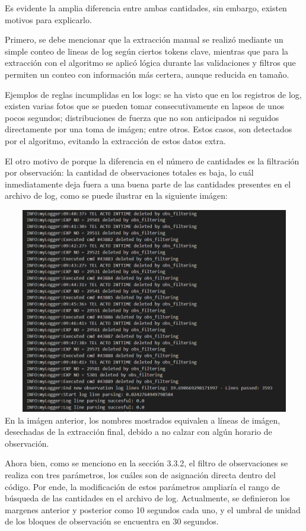 Es evidente la amplia diferencia entre ambas cantidades, sin embargo, existen motivos para explicarlo.

Primero, se debe mencionar que la extracción manual se realizó mediante un simple conteo de lineas de log según ciertos tokens clave, mientras que para la extracción con el algoritmo se aplicó lógica durante las validaciones y filtros que permiten un conteo con información más certera, aunque reducida en tamaño.

Ejemplos de reglas incumplidas en los logs: se ha visto que en los registros de log, existen varias fotos que se pueden tomar consecutivamente en lapsos de unos pocos segundos; distribuciones de fuerza que no son anticipados ni seguidos directamente por una toma de imágen; entre otros. Estos casos, son detectados por el algoritmo, evitando la extracción de estos datos extra.

El otro motivo de porque la diferencia en el número de cantidades es la filtración por observación: la cantidad de observaciones totales es baja, lo cuál inmediatamente deja fuera a una buena parte de las cantidades presentes en el archivo de log, como se puede ilustrar en la siguiente imágen:

\includegraphics[width=13.5cm,height=9cm]{figures/log_deletes.png} \\

En la imágen anterior, los nombres mostrados equivalen a líneas de imágen, desechadas de la extracción final, debido a no calzar con algún horario de observación.

Ahora bien, como se menciono en la sección 3.3.2, el filtro de observaciones se realiza con tres parámetros, los cuáles son de asignación directa dentro del código. Por ende, la modificación de estos parámetros ampliaría el rango de búsqueda de las cantidades en el archivo de log. Actualmente, se definieron los margenes anterior y posterior como 10 segundos cada uno, y el umbral de unidad de los bloques de observación se encuentra en 30 segundos.

